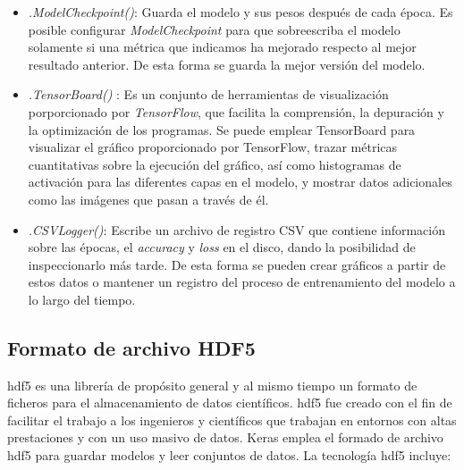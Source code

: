 \begin{itemize}
    \item \textit{.ModelCheckpoint()}: Guarda el modelo y sus pesos después de cada época. Es posible configurar \textit{ModelCheckpoint} para que sobreescriba el modelo solamente si una métrica que indicamos ha mejorado respecto al mejor resultado anterior. De esta forma se guarda la mejor versión del modelo.
    
    \item \textit{.TensorBoard()} \cite{tensorboard}: Es un conjunto de herramientas de visualización porporcionado por \textit{TensorFlow}, que facilita la comprensión, la depuración y la optimización de los programas. Se puede emplear TensorBoard para visualizar el gráfico proporcionado por TensorFlow, trazar métricas cuantitativas sobre la ejecución del gráfico, así como histogramas de activación para las diferentes capas en el modelo, y mostrar datos adicionales como las imágenes que pasan a través de él. 
    
    \item \textit{.CSVLogger()}: Escribe un archivo de registro CSV que contiene información sobre las épocas, el \textit{accuracy} y \textit{loss} en el disco, dando la posibilidad de inspeccionarlo más tarde. De esta forma se pueden crear gráficos a partir de estos datos o mantener un registro del proceso de entrenamiento del modelo a lo largo del tiempo.
\end{itemize}

\subsection{Formato de archivo HDF5}

\acrfull{hdf5} \cite{hdf5_1} \cite{hdf5_2} es una librería de propósito general y al mismo tiempo un formato de ficheros para el almacenamiento de datos científicos. \acrshort{hdf5} fue creado con el fin de facilitar el trabajo a los ingenieros y científicos que trabajan en entornos con altas prestaciones y con un uso masivo de datos. Keras emplea el formado de archivo \acrshort{hdf5} para guardar modelos y leer conjuntos de datos. La tecnología \acrshort{hdf5} incluye:

